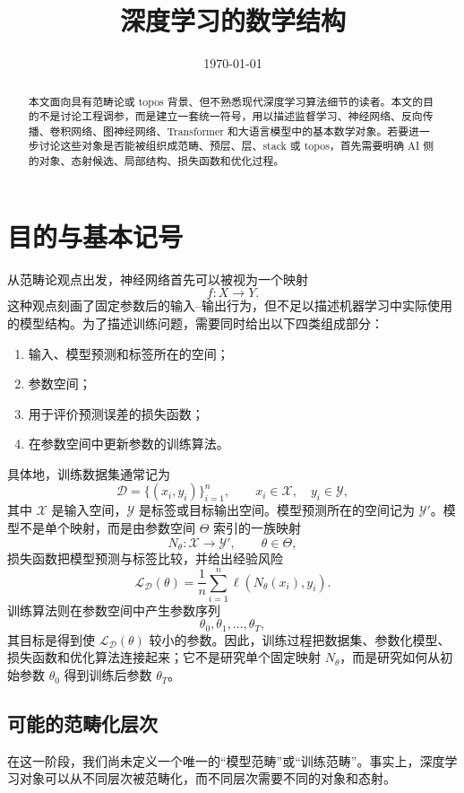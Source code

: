 \documentclass[UTF8,11pt,fontset=none]{ctexart}
\title{深度学习的数学结构}
\author{}
\date{\today}
\newcommand{\D}{\mathcal D}
\newcommand{\X}{\mathcal X}
\newcommand{\Y}{\mathcal Y}
\newcommand{\Ypred}{\mathcal Y'}
\newcommand{\ThetaSet}{\Theta}
\newcommand{\Loss}{\mathcal L}
\begin{document}
\maketitle

\begin{abstract}
本文面向具有范畴论或 topos 背景、但不熟悉现代深度学习算法细节的读者。本文的目的不是讨论工程调参，而是建立一套统一符号，用以描述监督学习、神经网络、反向传播、卷积网络、图神经网络、Transformer 和大语言模型中的基本数学对象。若要进一步讨论这些对象是否能被组织成范畴、预层、层、stack 或 topos，首先需要明确 AI 侧的对象、态射候选、局部结构、损失函数和优化过程。
\end{abstract}

\section{目的与基本记号}

从范畴论观点出发，神经网络首先可以被视为一个映射
\[
f:X\to Y.
\]
这种观点刻画了固定参数后的输入--输出行为，但不足以描述机器学习中实际使用的模型结构。为了描述训练问题，需要同时给出以下四类组成部分：
\begin{enumerate}
\item 输入、模型预测和标签所在的空间；
\item 参数空间；
\item 用于评价预测误差的损失函数；
\item 在参数空间中更新参数的训练算法。
\end{enumerate}
具体地，训练数据集通常记为
\[
\D=\{(x_i,y_i)\}_{i=1}^n,\qquad x_i\in\X,\quad y_i\in\Y,
\]
其中 \(\X\) 是输入空间，\(\Y\) 是标签或目标输出空间。模型预测所在的空间记为 \(\Ypred\)。模型不是单个映射，而是由参数空间 \(\ThetaSet\) 索引的一族映射
\[
N_\theta:\X\to\Ypred,\qquad \theta\in\ThetaSet,
\]
损失函数把模型预测与标签比较，并给出经验风险
\[
\Loss_{\D}(\theta)=\frac1n\sum_{i=1}^n \ell(N_\theta(x_i),y_i).
\]
训练算法则在参数空间中产生参数序列
\[
\theta_0,\theta_1,\ldots,\theta_T,
\]
其目标是得到使 \(\Loss_{\D}(\theta)\) 较小的参数。因此，训练过程把数据集、参数化模型、损失函数和优化算法连接起来；它不是研究单个固定映射 \(N_\theta\)，而是研究如何从初始参数 \(\theta_0\) 得到训练后参数 \(\theta_T\)。

\subsection{可能的范畴化层次}

在这一阶段，我们尚未定义一个唯一的“模型范畴”或“训练范畴”。事实上，深度学习对象可以从不同层次被范畴化，而不同层次需要不同的对象和态射。
\end{document}
